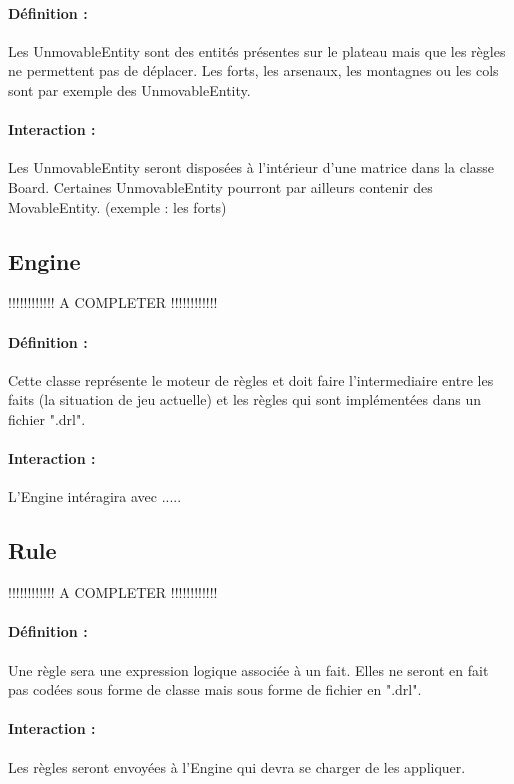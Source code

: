 			\paragraph{Définition :}
			Les UnmovableEntity sont des entités présentes sur le plateau mais que les règles ne permettent pas de déplacer. 
			Les forts, les arsenaux, les montagnes ou les cols sont par exemple des UnmovableEntity.
			\paragraph{Interaction :}
			Les UnmovableEntity seront disposées à l'intérieur d'une matrice dans la classe Board. 
			Certaines UnmovableEntity pourront par ailleurs contenir des MovableEntity. (exemple : les forts)

		\subsection*{Engine}

			!!!!!!!!!!!! A COMPLETER !!!!!!!!!!!!
			\paragraph{Définition :}
			Cette classe représente le moteur de règles et doit faire l'intermediaire entre les faits (la situation de jeu actuelle) 
			et les règles qui sont implémentées dans un fichier ".drl".
			\paragraph{Interaction :}
			L'Engine intéragira avec .....

		\subsection*{Rule}

			!!!!!!!!!!!! A COMPLETER !!!!!!!!!!!!
			\paragraph{Définition :}
			Une règle sera une expression logique associée à un fait. Elles ne seront en fait pas codées sous forme de classe mais 
			sous forme de fichier en ".drl".
			\paragraph{Interaction :}
			Les règles seront envoyées à l'Engine qui devra se charger de les appliquer.

